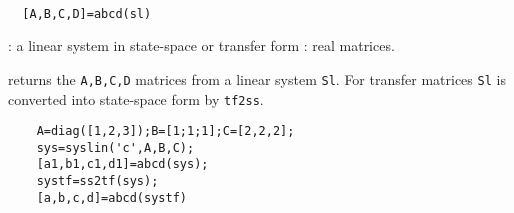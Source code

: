 \begin{mandesc}
   \\ %
\end{mandesc}
\begin{calling_sequence}
\begin{verbatim}
  [A,B,C,D]=abcd(sl)  
\end{verbatim}
\end{calling_sequence}
\begin{parameters}
  \begin{varlist}
    : a linear system in state-space or transfer form
    : real matrices.
  \end{varlist}
\end{parameters}
\begin{mandescription}
  returns the \verb!A,B,C,D! matrices from a linear system \verb!Sl!.
  For transfer matrices \verb!Sl! is converted
  into state-space form by \verb!tf2ss!.
\end{mandescription}
\begin{examples}
  \begin{Verbatim}
    A=diag([1,2,3]);B=[1;1;1];C=[2,2,2];
    sys=syslin('c',A,B,C);
    [a1,b1,c1,d1]=abcd(sys);
    systf=ss2tf(sys);
    [a,b,c,d]=abcd(systf)
  \end{Verbatim}
\end{examples}
\begin{manseealso}
     
\end{manseealso}
